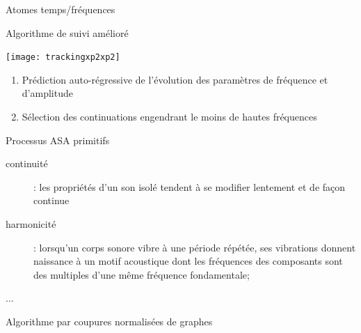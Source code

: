 \begin{frame}{Atomes temps/fréquences}
\begin{center}
\end{center}
\end{frame}

\begin{frame}{Algorithme de suivi amélioré}
\begin{center}
  \texttt{[image: trackingxp2xp2]}
\end{center}
  \begin{enumerate}
      \item Prédiction auto-régressive de l'évolution des paramètres de fréquence et d'amplitude
      \item Sélection des continuations engendrant le moins de hautes fréquences
  \end{enumerate}
\end{frame}


\begin{frame}{Processus ASA \og primitifs \fg}
\begin{description}
\item[\alert{continuité}] : les propriétés d'un son isolé tendent à se modifier lentement et de façon continue
\item[\alert{harmonicité}] : lorsqu'un corps sonore vibre à une période répétée, ses vibrations donnent naissance à un motif acoustique dont les fréquences des composants sont des multiples d'une même fréquence fondamentale;
\item[...]
\end{description}
\end{frame}
 
\begin{frame}{Algorithme par coupures normalisées de graphes}
\begin{center}
\end{center}
\end{frame}



